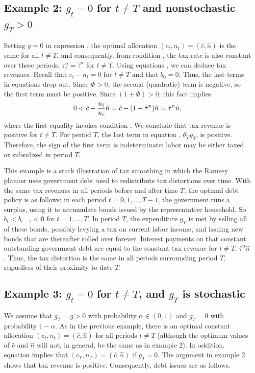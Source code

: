 \subsection{Example 2: $g_t=0$ for $t\not= T$ and nonstochastic $g_T>0$}
\label{sec:LucasStokey_ex2}%
Setting $g=0$ in expression , the optimal
allocation  $(c_t,n_t)=(\hat c, \hat n)$ is the same  for all $t\not= T$,
and consequently, from condition , the tax rate is also constant
over these periods, $\tau^n_t=\hat \tau^n$ for $t\not= T$. Using
equations , we can deduce tax revenues.
Recall that $c_t-n_t=0$ for $t\neq T$  and that $b_0=0$. Thus, the
last terms in equations 
drop out. Since $\Phi>0$, the second (quadratic) term is negative, so
the first term must be positive. Since $(1+\Phi)>0$, this fact implies
$$
0<\hat c - {u_{\ell} \over u_c} \hat n = \hat c - (1-\hat \tau^n) \hat n
 = \hat \tau^n \hat n,
$$
where the first equality invokes condition . We conclude that
tax revenue is positive for $t\not= T$. For period $T$, the last term
in equation , $\theta_T g_T$, is positive. Therefore, the sign
of the first term is indeterminate: labor may be either taxed or
subsidized in period $T$.

This example is a stark illustration of tax smoothing in which the Ramsey planner uses government  debt
used to redistribute tax distortions over time. With the same tax
revenues in all periods before and after time $T$, the optimal debt
policy is as follows: in each period $t=0,1, \ldots ,T-1$, the government
runs a surplus, using it to accumulate  bonds issued by the representative household.
So $b_t < b_{t-1} < 0$ for $t = 1, \ldots , T$.
In period $T$, the expenditure $g_T$ is met by selling all of these
bonds, possibly levying a tax on current labor income, and issuing
new bonds that are thereafter rolled over forever. Interest payments
on that constant outstanding government debt are equal to the constant
tax revenue for $t\not= T$,
$\hat \tau^n \hat n$. Thus, the tax distortion is the same in all periods
surrounding period $T$, regardless of their proximity to  date $T$. %

\subsection{Example 3: $g_t=0$ for $t\not= T$, and $g_T$ is stochastic}
\label{sec:LucasStokey_ex3}%
We assume that $g_T=g>0$ with probability $\alpha \in (0,1)$ and $g_T=0$ with
probability $1-\alpha$.  As in the previous example, there is an
optimal constant allocation $(c_t,n_t)=(\hat c, \hat n)$ for all
periods $t\not= T$ (although the optimum values of $\hat c$ and
$\hat n$ will not, in general, be the same as in example 2). In addition,
equation  implies that $(c_T,n_T)=(\hat c, \hat n)$ if $g_T=0$.
The argument in example 2 shows that tax revenue is positive. Consequently, debt issues are as follows.

